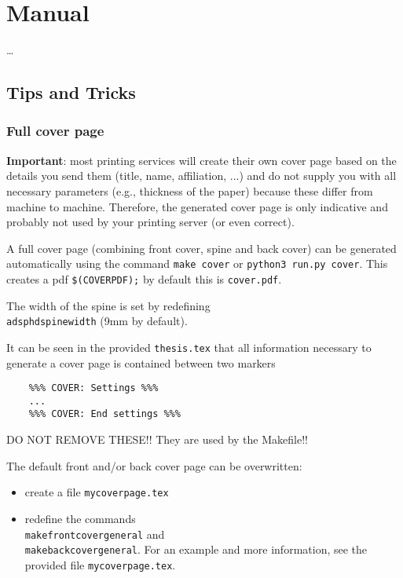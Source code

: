 \chapter{Manual}\label{ch:manual}


\ldots

\section{Tips and Tricks}


\subsection{Full cover page}

\textbf{Important}: most printing services will create their own cover page based
on the details you send them (title, name, affiliation, ...) and do not supply
you with all necessary parameters (e.g., thickness of the paper) because these
differ from machine to machine. Therefore, the generated cover page is only
indicative and probably not used by your printing server (or even correct).


A full cover page (combining front cover, spine and back cover) can be
generated automatically using the command \texttt{make cover} or \texttt{python3 run.py cover}. This creates a pdf
\texttt{\$(COVERPDF);} by default this is \texttt{cover.pdf}.

The width of the spine is set by redefining \texttt{\\adsphdspinewidth} (9mm by default).

It can be seen in the provided \texttt{thesis.tex} that all information necessary to
generate a cover page is contained between two markers

\begin{verbatim}
    %%% COVER: Settings %%%
    ...
    %%% COVER: End settings %%%
\end{verbatim}

DO NOT REMOVE THESE!! They are used by the Makefile!!

The default front and/or back cover page can be overwritten: 

\begin{itemize}
    \item create a file \texttt{mycoverpage.tex}
    \item redefine the commands \texttt{\\makefrontcovergeneral} and \texttt{\\makebackcovergeneral}. For
          an example and more information, see the provided file \texttt{mycoverpage.tex}.
\end{itemize}

